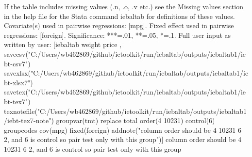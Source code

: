 If the table includes missing values (.n, .o, .v etc.) see the Missing values section in the help file for the Stata command iebaltab for definitions of these values. Covariate(s) used in pairwise regressions: [mpg]. Fixed effect used in pairwise regressions: [foreign]. Significance: ***=.01, **=.05, *=.1. Full user input as written by user: [iebaltab weight price , savecsv("C:/Users/wb462869/github/ietoolkit/run/iebaltab/outputs/iebaltab1/iebt-csv7") savexlsx("C:/Users/wb462869/github/ietoolkit/run/iebaltab/outputs/iebaltab1/iebt-xlsx7") savetex("C:/Users/wb462869/github/ietoolkit/run/iebaltab/outputs/iebaltab1/iebt-tex7") texnotefile("C:/Users/wb462869/github/ietoolkit/run/iebaltab/outputs/iebaltab1/iebt-tex7-note") groupvar(tmt) replace total order(4 10231) control(6) groupcodes cov(mpg) fixed(foreign) addnote("column order should be 4 10231 6 2, and 6 is control so pair test only with this group")] column order should be 4 10231 6 2, and 6 is control so pair test only with this group
